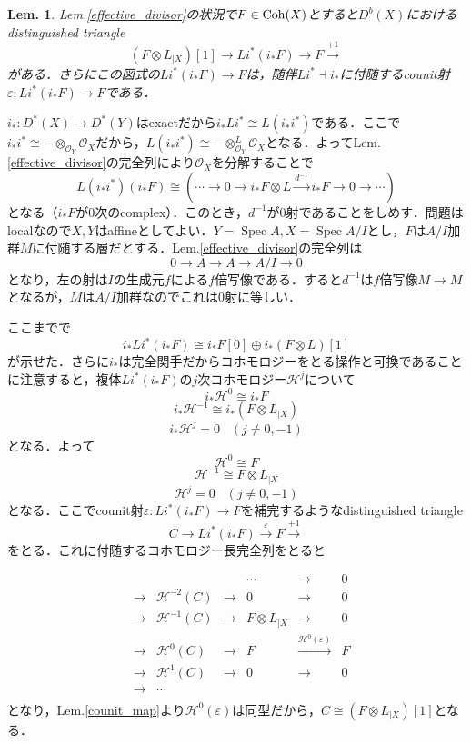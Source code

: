 \documentclass[uplatex,a4paper,11pt,dvipdfmx]{jsarticle}
\makeatletter
\theoremstyle{mystyle} %
\newtheorem{lemma}{Lem.}[section]
\renewenvironment{proof}[1][\proofname]{\par
 \pushQED{\qed}%
 \normalfont \topsep6\p@\@plus6\p@\relax
 \trivlist
 \item[\hskip\labelsep
 \itshape
 {\bf\underline{#1}}]\ignorespaces
}{%
 \popQED\endtrivlist\@endpefalse
}
\DeclareMathOperator{\Spec}{Spec}
\makeatother
\begin{document}
\begin{lemma}\label{pullback}
	Lem.\ref{effective_divisor}の状況で$F \in \operatorname{Coh}(X)$とすると$D^b(X)$におけるdistinguished triangle
	$$(F\otimes L_{|X})[1] \to Li^*(i_*F) \to F \xrightarrow{+1}$$がある．さらにこの図式の$Li^*(i_*F) \to F$は，随伴$Li^* \dashv i_*$に付随するcounit射$\varepsilon \colon Li^*(i_*F) \to F$である．
\end{lemma}
\begin{proof}
	$i_* \colon D^*(X) \to D^*(Y)$はexactだから$i_*Li^* \cong L(i_*i^*)$である．ここで$i_*i^* \cong -\otimes_{\mathcal{O}_Y}\mathcal{O}_X$だから，$L(i_*i^*) \cong -\otimes^L_{\mathcal{O}_Y}\mathcal{O}_X$となる．よってLem.\ref{effective_divisor}の完全列により$\mathcal{O}_X$を分解することで$$L(i_*i^*)(i_*F) \cong (\cdots \to 0 \to i_*F\otimes L \xrightarrow{d^{-1}} i_*F \to 0 \to \cdots)$$となる（$i_*F$が$0$次のcomplex）．このとき，$d^{-1}$が$0$射であることをしめす．問題はlocalなので$X, Y$はaffineとしてよい．$Y=\Spec{A}, X = \Spec{A/I}$とし，$F$は$A/I$加群$M$に付随する層だとする．Lem.\ref{effective_divisor}の完全列は$$0 \to A \to A \to A/I \to 0$$となり，左の射は$I$の生成元$f$による$f$倍写像である．すると$d^{-1}$は$f$倍写像$M \to M$となるが，$M$は$A/I$加群なのでこれは$0$射に等しい．

	ここまでで$$i_*Li^*(i_*F) \cong i_*F[0] \oplus i_*(F\otimes L)[1]$$が示せた．さらに$i_*$は完全関手だからコホモロジーをとる操作と可換であることに注意すると，複体$Li^*(i_*F)$の$j$次コホモロジー$\mathcal{H}^j$について$$i_*\mathcal{H}^0 \cong i_*F$$$$i_*\mathcal{H}^{-1}\cong i_*(F \otimes L_{|X})$$$$i_*\mathcal{H}^j = 0 \hspace{10pt}(j \neq 0, -1)$$となる．よって$$\mathcal{H}^0 \cong F$$$$\mathcal{H}^{-1}\cong F \otimes L_{|X}$$$$\mathcal{H}^j = 0 \hspace{10pt}(j \neq 0, -1)$$となる．ここでcounit射$\varepsilon \colon Li^*(i_*F) \to F$を補完するようなdistinguished triangle$$C\to Li^*(i_*F) \xrightarrow{\varepsilon} F \xrightarrow{+1}$$をとる．これに付随するコホモロジー長完全列をとると

	\[
		\begin{array}{ccccccc}
			 &     &                     &     & \cdots           & \to                                      & 0 \\
			 & \to & \mathcal{H}^{-2}(C) & \to & 0                & \to                                      & 0 \\
			 & \to & \mathcal{H}^{-1}(C) & \to & F \otimes L_{|X} & \to                                      & 0 \\
			 & \to & \mathcal{H}^{0}(C)  & \to & F                & \xrightarrow{\mathcal{H}^0(\varepsilon)} & F \\
			 & \to & \mathcal{H}^{1}(C)  & \to & 0                & \to                                      & 0 \\
			 & \to & \cdots              &     &                  &                                          &   \\
		\end{array}
	\]
	となり，Lem.\ref{counit_map}より$\mathcal{H}^0(\varepsilon)$は同型だから，$C \cong (F \otimes L_{|X})[1]$となる．
\end{proof}
\end{document}

